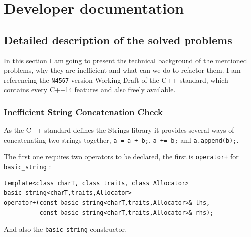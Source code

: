 \section{Developer documentation}
\subsection{Detailed description of the solved problems}
\par In this section I am going to present the technical background of the mentioned problems, why they are inefficient and what can we do to refactor them. I am referencing the \verb|N4567|\cite{cpp_standard} version Working Draft of the C++ standard, which contains every C++14 features and also freely available. 
\subsubsection{Inefficient String Concatenation Check}
\par As the C++ standard defines the Strings library it provides several ways of concatenating two strings together, \verb|a = a + b;|, \verb|a += b;| and \verb|a.append(b);|. \medskip
\par The first one requires two operators to be declared, the first is \verb|operator+| for \verb|basic_string| \cite[\S21.4.8.1]{cpp_standard}: 
\begin{verbatim}
template<class charT, class traits, class Allocator>
basic_string<charT,traits,Allocator>
operator+(const basic_string<charT,traits,Allocator>& lhs,
          const basic_string<charT,traits,Allocator>& rhs);
\end{verbatim}
\par And also the \verb|basic_string| constructor.
